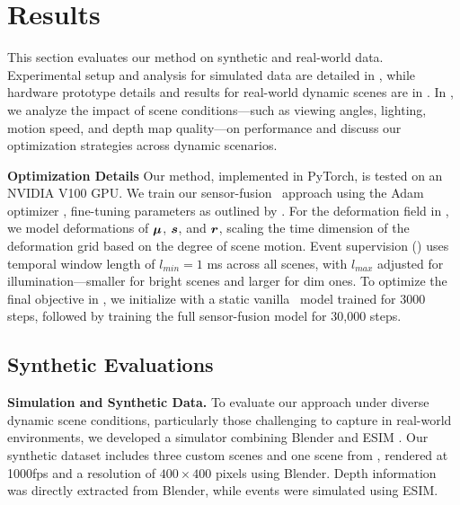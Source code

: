 \section{Results}
\label{experiments}




This section evaluates our method on synthetic and real-world data. 
Experimental setup and analysis for simulated data are detailed in \subsectionautorefname{~\ref{syn_exp}}, while hardware prototype details and results for real-world dynamic scenes are in \subsectionautorefname{~\ref{real_world_exp}}. 
In \subsectionautorefname{~\ref{analysis}}, we analyze the impact of scene conditions---such as viewing angles, lighting, motion speed, and depth map quality---on performance and discuss our optimization strategies 
across dynamic scenarios.

\vspace{1mm}
\noindent
\textbf{Optimization Details}
Our method, implemented in PyTorch, is tested on an NVIDIA V100 GPU. 
We train our sensor-fusion \gs~approach using the Adam optimizer \cite{diederik2014adam}, fine-tuning parameters as outlined by \citet{kerbl20233d}. 
For the deformation field in \equationautorefname{~\ref{eq:deformation-field}}, 
we model deformations of $\bm{\mu}$, $\bm{s}$, and $\bm{r}$, scaling the time dimension of the deformation grid based on the degree of scene motion.
Event supervision (\equationautorefname{~\ref{eq:event-splat}}) uses temporal window length of $l_{min}=1$ ms across all scenes, with $l_{max}$ adjusted for illumination---smaller for bright scenes and larger for dim ones.
To optimize the final objective in \equationautorefname{~\ref{eq:final-objective}}, we initialize with a static vanilla \gs~model trained for 3000 steps, followed by training the full sensor-fusion model for 30,000 steps.


\subsection{Synthetic Evaluations}
\label{syn_exp}



\noindent
\textbf{Simulation and Synthetic Data.}
To evaluate our approach under diverse dynamic scene conditions, particularly those challenging to capture in real-world environments, we developed a simulator combining Blender \cite{blender} and ESIM \cite{rebecq2018esim}. 
Our synthetic dataset includes three custom scenes and one scene from \citet{ma2023deformable},
rendered at 1000fps and a resolution of $400\times 400$ pixels using Blender. Depth information was directly extracted from Blender, while events were simulated using ESIM.


